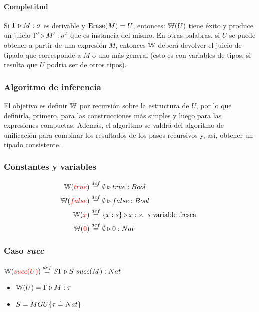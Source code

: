 \paragraph{Completitud} Si $\Gamma\triangleright M : \sigma$ es derivable y $\operatorname{Erase}(M) = U$, entonces:
$\mathbb{W}(U)$ tiene éxito y produce un juicio $\Gamma'\triangleright M' : \sigma'$ que es instancia del mismo. En otras palabras, si $U$ se puede obtener a partir de una expresión $M$, entonces $\mathbb{W}$ deberá devolver el juicio de tipado que corresponde a $M$ o uno más general (esto es con variables de tipos, si resulta que $U$ podría ser de otros tipos).

\subsubsection{Algoritmo de inferencia}
El objetivo es definir $\mathbb{W}$ por recursión sobre la estructura de $U$, por lo que definirla, primero, para las construcciones más simples y luego para las expresiones compuetas. Además, el algoritmo se valdrá del algoritmo de unificación para combinar los resultados de los pasos recursivos y, así, obtener un tipado consistente.

\subsubsection{Constantes y variables}
\begin{equation*}
\begin{split}
\mathbb{W}({\color{red}true}) &\overset{def}{=} \emptyset\triangleright true : Bool \\
\mathbb{W}({\color{red}false}) &\overset{def}{=} \emptyset\triangleright false : Bool \\
\mathbb{W}({\color{red}x}) &\overset{def}{=} \{x:s\}\triangleright x : s, \text{ \textit{s} variable fresca } \\
\mathbb{W}({\color{red}0}) &\overset{def}{=} \emptyset\triangleright 0 : Nat \\
\end{split}
\end{equation*}

\subsubsection{Caso \textit{succ}}
$\mathbb{W}({\color{red}succ(U)}) \overset{def}{=} S\Gamma\triangleright S~succ(M) : Nat$
\begin{centrado}
\begin{itemize}
\item $\mathbb{W}(U) = \Gamma\triangleright M : \tau$
\item $S = MGU\{\tau\overset{\cdot}{=} Nat\}$
\end{itemize}
\end{centrado}

